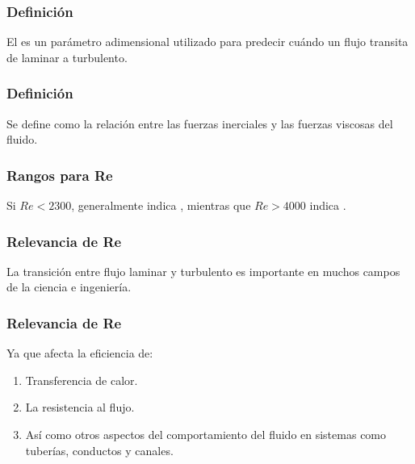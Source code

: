 \documentclass[14pt]{beamer}
\begin{document}
\begin{frame}
\frametitle{Definición}
El  es un parámetro adimensional utilizado para predecir cuándo un flujo transita de laminar a turbulento.
\end{frame}
\begin{frame}
\frametitle{Definición}
Se define como la relación entre las fuerzas inerciales y las fuerzas viscosas del fluido.
\end{frame}
\begin{frame}
\frametitle{Rangos para Re}
Si $Re < 2300$, generalmente indica , \pause mientras que $Re > 4000$ indica .
\end{frame}
\begin{frame}
\frametitle{Relevancia de Re}
La transición entre flujo laminar y turbulento es importante en muchos campos de la ciencia e ingeniería.
\end{frame}
\begin{frame}
\frametitle{Relevancia de Re}
Ya que afecta la eficiencia de:
\begin{enumerate}[<+->]
\item Transferencia de calor.
\item La resistencia al flujo.
\item Así como otros aspectos del comportamiento del fluido en sistemas como tuberías, conductos y canales.
\end{enumerate}
\end{frame}
\end{document}
